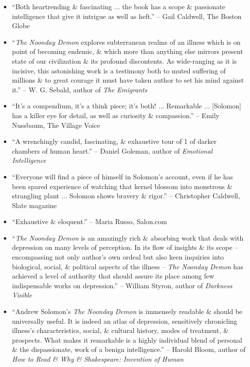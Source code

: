 \documentclass{article}
\begin{document}
\begin{itemize}
\begin{itemize}
		\item ``Both heartrending \& fascinating $\ldots$ the book has a scope \& passionate intelligence that give it intrigue as well as heft.'' -- {\sc Gail Caldwell}, The Boston Globe
		\item ``{\it The Noonday Demon} explores subterranean realms of an illness which is on point of becoming endemic, \& which more than anything else mirrors present state of our civilization \& its profound discontents. As wide-ranging as it is incisive, this astonishing work is a testimony both to muted suffering of millions \& to great courage it must have taken  author to set his mind against it.'' -- {\sc W. G. Sebald}, author of {\it The Emigrants}
		\item ``It's a compendium, it's a think piece; it's both! $\ldots$ Remarkable $\ldots$ [{\sc Solomon}] has a killer eye for detail, as well as curiosity \& compassion.'' -- {\sc Emily Nussbaum}, The Village Voice
		\item ``A wrenchingly candid, fascinating, \& exhaustive tour of 1 of darker chambers of human heart.'' -- {\sc Daniel Goleman}, author of {\it Emotional Intelligence}
		\item ``Everyone will find a piece of himself in {\sc Solomon}'s account, even if he has been spared experience of watching that kernel blossom into monstrous \& strangling plant $\ldots$ {\sc Solomon} shows bravery \& rigor.'' -- {\sc Christopher Caldwell}, Slate magazine
		\item ``Exhaustive \& eloquent.'' -- {\sc Maria Russo}, Salon.com
		\item ``{\it The Noonday Demon} is an amazingly rich \& absorbing work that deals with depression on many levels of perception. In its flow of insights \& its scope -- encompassing not only author's own ordeal but also keen inquiries into biological, social, \& political aspects of the illness -- {\it The Noonday Demon} has achieved a level of authority that should assure its place among few indispensable works on depression.'' -- {\sc William Styron}, author of {\it Darkness Visible}
		\item ``{\sc Andrew Solomon}'s {\it The Noonday Demon} is immensely readable \& should be universally useful. It is indeed an atlas of depression, sensitively chronicling illness's characteristics, social, \& cultural history, modes of treatment, \& prospects. What makes it remarkable is a highly individual blend of personal \& the dispassionate, work of a benign intelligence.'' -- {\sc Harold Bloom}, author of {\it How to Read \& Why \& Shakespeare: Invention of Human}

\end{itemize}
\end{itemize}
\end{document}
